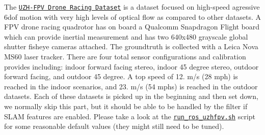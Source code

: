 The \href{https://fpv.ifi.uzh.ch/}{\tt U\+Z\+H-\/\+F\+PV Drone Racing Dataset} \cite{Schubert2018IROS} is a dataset focused on high-\/speed agressive 6dof motion with very high levels of optical flow as compared to other datasets. A F\+PV drone racing quadrotor has on board a Qualcomm Snapdragon Flight board which can provide inertial measurement and has two 640x480 grayscale global shutter fisheye camera\textquotesingle{}s attached. The groundtruth is collected with a Leica Nova M\+S60 laser tracker. There are four total sensor configurations and calibration provides including\+: indoor forward facing stereo, indoor 45 degree stereo, outdoor forward facing, and outdoor 45 degree. A top speed of 12. m/s (28 mph) is reached in the indoor scenarios, and 23. m/s (54 mphs) is reached in the outdoor datasets. Each of these datasets is picked up in the beginning and then set down, we normally skip this part, but it should be able to be handled by the filter if S\+L\+AM features are enabled. Please take a look at the \href{https://github.com/rpng/open_vins/blob/master/ov_msckf/scripts/run_ros_uzhfpv.sh}{\tt run\+\_\+ros\+\_\+uzhfpv.\+sh} script for some reasonable default values (they might still need to be tuned).



